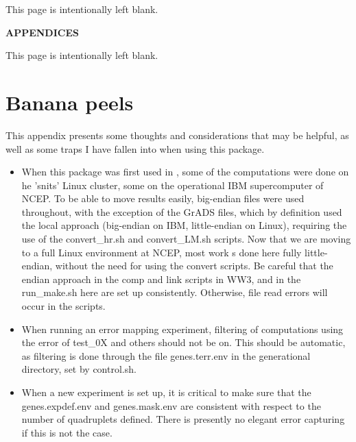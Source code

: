 \documentclass[12pt]{article}
\newcommand{\pstyle}{plain}
\newcommand{\ws}{WW3}
\newcommand{\file}{\sf}
\newcommand{\pb}{\strut \vfill \pagebreak}
\newcommand{\bpage}{\vfill \pagebreak \strut

\vspace{2.5in} \centerline{This page is intentionally left blank.}}
\newcommand{\bpagea}{\strut

\vspace{2.5in} \centerline{This page is intentionally left blank.}}
\newcommand{\newsec}{\setcounter{equation}{0}
                      \setcounter{myfigno}{0}
                      \setcounter{mytabno}{0}}
\newcounter{myfigno}[section]
\newcounter{mytabno}[section]
\begin{document}
\pb
\setcounter{footnote}{0}


%


\pb
\pagestyle{empty}
\bpagea

\pb \strut
\pagestyle{empty}


\vspace{2.5in} \centerline{\large \bf APPENDICES}
\appendix

\bpage
\pb \newsec \setcounter{page}{1} \pagestyle{\pstyle}
\renewcommand{\thepage}{\thesection.\arabic{page}}
\section{Banana peels} \label{app:hints}

\noindent
This appendix presents some thoughts and considerations that may be helpful,
as well as some traps I have fallen into when using this package. 

\begin{itemize}

\item When this package was first used in \citep{tol:MMAB10d}, some of the
  computations were done on he 'snits' Linux cluster, some on the operational
  IBM supercomputer of NCEP. To be able to move results easily, big-endian
  files were used throughout, with the exception of the GrADS files, which by
  definition used the local approach (big-endian on IBM, little-endian on
  Linux), requiring the use of the {\file convert\_hr.sh} and {\file
    convert\_LM.sh } scripts. Now that we are moving to a full Linux
  environment at NCEP, most work s done here fully little-endian, without the
  need for using the convert scripts. Be careful that the endian approach in
  the {\file comp} and {\file link} scripts in \ws, and in the {\file
    run\_make.sh} here are set up consistently. Otherwise, file read errors
  will occur in the scripts.

\item When running an error mapping experiment, filtering of computations
  using the error of {\file test\_0X} and others should not be on. This should
  be automatic, as filtering is done through the file {\file genes.terr.env}
  in the generational directory, set by {\file control.sh}.

\item When a new experiment is set up, it is critical to make sure that the
  {\file genes.expdef.env} and {\file genes.mask.env} are consistent with
  respect to the number of quadruplets defined. There is presently no elegant
  error capturing if this is not the case. 

\end{itemize}
\end{document}

